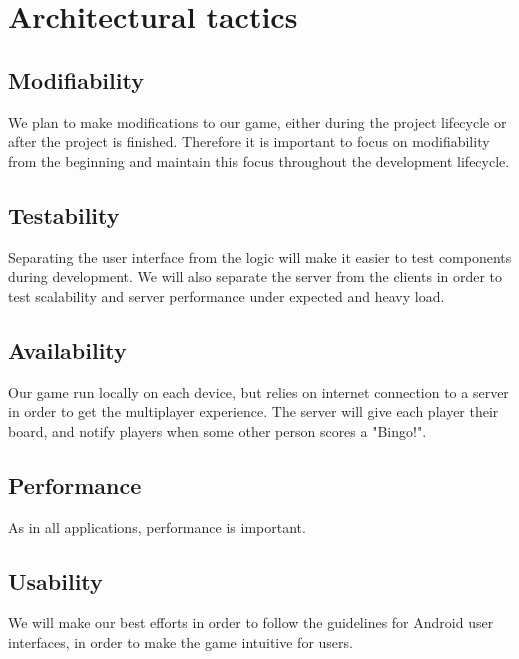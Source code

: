\section{Architectural tactics}
\label{sec:architecturaltactics}

\subsection{Modifiability} 
We plan to make modifications to our game, either during the project lifecycle or after the project is finished. Therefore it is important to focus on modifiability from the beginning and maintain this focus throughout the development lifecycle. 

\subsection{Testability}
Separating the user interface from the logic will make it easier to test components during development. We will also separate the server from the clients in order to test scalability and server performance under expected and heavy load.

\subsection{Availability} 
Our game run locally on each device, but relies on internet connection to a server in order to get the multiplayer experience. The server will give each player their board, and notify players when some other person scores a "Bingo!". 

\subsection{Performance}
As in all applications, performance is important. 

\subsection{Usability} 
We will make our best efforts in order to follow the guidelines for Android user interfaces, in order to make the game intuitive for users.
